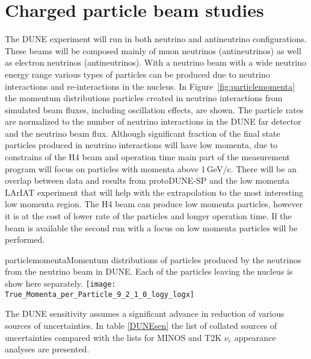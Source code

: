 \section{Charged particle beam studies}

The DUNE experiment will run in both neutrino and antineutrino 
configurations. These beams will be composed mainly of muon neutrinos (antineutrinos) as well as electron neutrinos (antineutrinos). With a neutrino beam with a wide neutrino energy range various types of particles can be produced due to neutrino interactions and re-interactions in the nucleus.  In Figure~\ref{fig:particlemomenta} the momentum distributions particles created in 
neutrino interactions from simulated beam fluxes, including oscillation effects, are shown.  The particle rates are normalized  to the number of neutrino interactions in 
the DUNE far detector and the neutrino beam flux.  Although significant fraction of the final state particles produced in neutrino interactions  will have low momenta, due to constrains of the H4 beam and operation time main part of the measurement program will focus on particles with momenta above 1\,GeV/c. There will be an overlap between data and results from protoDUNE-SP and the low momenta LArIAT experiment that will help with the extrapolation to the most interesting low momenta region.  The H4 beam can produce low momenta particles, however it is at the cost of lower rate of the particles and longer operation time. If the beam is available the second run with a focus on  low momenta particles will be performed. 


\begin{cdrfigure} {particlemomenta}{Momentum distributions of particles produced by the neutrinos from the neutrino beam in DUNE.  Each of the particles leaving the nucleus is show here separately. } 
  \texttt{[image: True\_Momenta\_per\_Particle\_9\_2\_1\_0\_logy\_logx]}
\end{cdrfigure}

The DUNE sensitivity assumes a significant advance in reduction of various sources of uncertainties. In table \ref{DUNEsen} the list of collated sources of uncertainties compared with the lists for MINOS and T2K $\nu_e$ appearance analyses are presented. 

